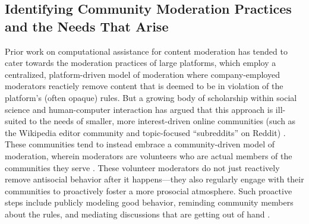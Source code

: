 \documentclass[11pt,letterpaper]{article}
\begin{document}
\subsection{Identifying Community Moderation Practices and the Needs That Arise}
Prior work on computational assistance for content moderation has tended to cater towards the moderation practices of large platforms, which employ a centralized, platform-driven model of moderation where company-employed moderators reactiely remove content that is deemed to be in violation of the platform's (often opaque) rules.
But a growing body of scholarship within social science and human-computer interaction has argued that this approach is ill-suited to the needs of smaller, more interest-driven online communities (such as the Wikipedia editor community and topic-focused ``subreddits'' on Reddit) \cite{jurgens_just_2019,seering_reconsidering_2020}.
These communities tend to instead embrace a community-driven model of moderation, wherein moderators are volunteers who are actual members of the communities they serve \cite{lo_when_2018}.
These volunteer moderators do not just reactively remove antisocial behavior after it happens---they also regularly engage with their communities to proactively foster a more prosocial atmosphere.
Such proactive steps include publicly modeling good behavior, reminding community members about the rules, and mediating discussions that are getting out of hand \cite{seering_shaping_2017,billings_understanding_2010}.
\end{document}
